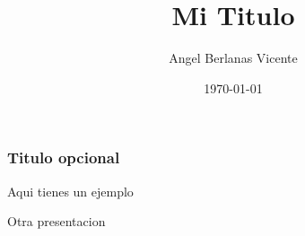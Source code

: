 \documentclass{beamer}
\title{Mi Titulo}
\author{Angel Berlanas Vicente}
\date{\today}
\begin{document}
\begin{frame}
\frametitle{Titulo opcional}
Aqui tienes un ejemplo
\end{frame}

\begin{frame}
Otra presentacion
\end{frame}
\end{document}
